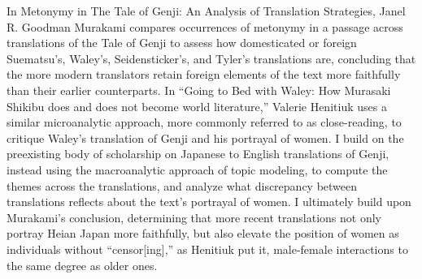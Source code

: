 \documentclass[12pt]{article}
\begin{document}
\begin{flushleft}
\begin{spacing}{2.0}
In Metonymy in The Tale of Genji: An Analysis of Translation Strategies, Janel R. Goodman Murakami compares occurrences of metonymy in a passage across translations of the Tale of Genji to assess how domesticated or foreign Suematsu's, Waley's, Seidensticker's, and Tyler's translations are, concluding that the more modern translators retain foreign elements of the text more faithfully than their earlier counterparts. In ``Going to Bed with Waley: How Murasaki Shikibu does and does not become world literature,'' Valerie Henitiuk uses a similar microanalytic approach, more commonly referred to as close-reading, to critique Waley's translation of Genji and his portrayal of women. I build on the preexisting body of scholarship on Japanese to English translations of Genji, instead using the macroanalytic approach of topic modeling, to compute the themes across the translations, and analyze what discrepancy between translations reflects about the text's portrayal of women. I ultimately build upon Murakami's conclusion, determining that more recent translations not only portray Heian Japan more faithfully, but also elevate the position of women as individuals without ``censor[ing],'' as Henitiuk put it, male-female interactions to the same degree as older ones. 


\end{spacing}
\end{flushleft}
\end{document}
